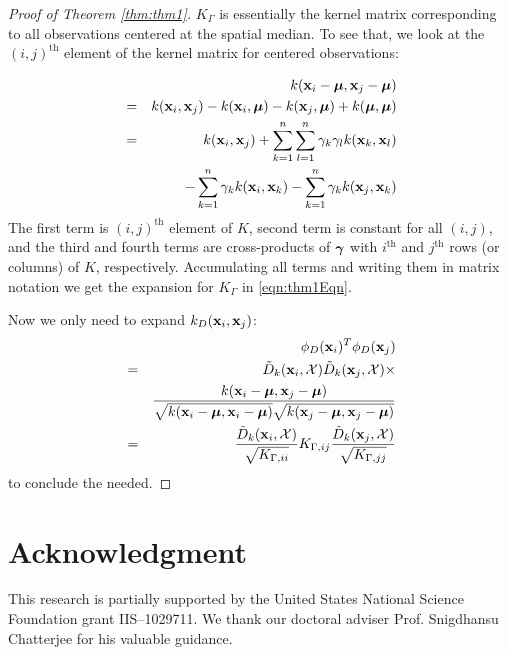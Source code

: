 \documentclass[10pt, conference, compsocconf]{IEEEtran}
\begin{document}
\begin{proof}[Proof of Theorem \ref{thm:thm1}]
$K_\Gamma$ is essentially the kernel matrix corresponding to all observations centered at the spatial median. To see that, we look at the $(i,j)^\text{th}$ element of the kernel matrix for centered observations:

\begin{eqnarray*}
&& k({\bf{x}}_i-{\boldsymbol{\mu}}, {\bf{x}}_j-{\boldsymbol{\mu}})\\
&=& k({\bf{x}}_i, {\bf{x}}_j) - k({\bf{x}}_i, {\boldsymbol{\mu}}) - k({\bf{x}}_j, {\boldsymbol{\mu}}) + k({\boldsymbol{\mu}}, {\boldsymbol{\mu}})\\
&=& k({\bf{x}}_i, {\bf{x}}_j) + \sum_{k=1}^n \sum_{l=1}^n \gamma_k \gamma_l k({\bf{x}}_k, {\bf{x}}_l) \\
&& - \sum_{k=1}^n \gamma_k k({\bf{x}}_i, {\bf{x}}_k) - \sum_{k=1}^n \gamma_k k({\bf{x}}_j, {\bf{x}}_k) \\
\end{eqnarray*}
The first term is $(i,j)^\text{th}$ element of $K$, second term is constant for all $(i,j)$, and the third and fourth terms are cross-products of ${\boldsymbol{\gamma}}$ with $i^\text{th}$ and $j^\text{th}$ rows (or columns) of $K$, respectively. Accumulating all terms and writing them in matrix notation we get the expansion for $K_\Gamma$ in \ref{eqn:thm1Eqn}.

Now we only need to expand $k_D({\bf{x}}_i, {\bf{x}}_j)$:
\begin{eqnarray*}
&&\phi_D({\bf{x}}_i)^T \phi_D({\bf{x}}_j)\\
&=& \tilde D_k ({\bf{x}}_i, \mathcal X) \tilde D_k ({\bf{x}}_j, \mathcal X) \times\\
&& \frac{k({\bf{x}}_i-{\boldsymbol{\mu}}, {\bf{x}}_j-{\boldsymbol{\mu}})}{\sqrt{k({\bf{x}}_i-{\boldsymbol{\mu}}, {\bf{x}}_i-{\boldsymbol{\mu}})}\sqrt{k({\bf{x}}_j-{\boldsymbol{\mu}}, {\bf{x}}_j-{\boldsymbol{\mu}})}}\\
&=& \frac{\tilde D_k ({\bf{x}}_i, \mathcal X)}{\sqrt{K_{\Gamma,ii}}} K_{\Gamma,ij} \frac{\tilde D_k ({\bf{x}}_j, \mathcal X)}{\sqrt{K_{\Gamma,jj}}}
\end{eqnarray*}
to conclude the needed.
\end{proof}

\section*{Acknowledgment}

This research is partially supported by the United States National Science Foundation grant IIS--1029711. We thank our doctoral adviser Prof. Snigdhansu Chatterjee for his valuable guidance.

\end{document}
